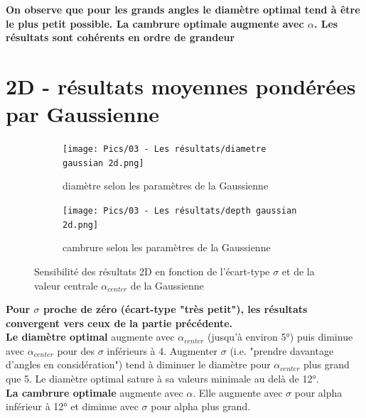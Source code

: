 \textbf{On observe que pour les grands angles le diamètre optimal tend à être le plus petit possible. La cambrure optimale augmente avec $\alpha$. Les résultats sont cohérents en ordre de grandeur}


\section{2D - résultats moyennes pondérées par Gaussienne}
\label{sec:Ch3.2}


\begin{figure}[h!]
    \centering
    \begin{subfigure}[b]{0.45\textwidth}
        \centering
        \texttt{[image: Pics/03 - Les résultats/diametre gaussian 2d.png]}
        \caption{diamètre selon les paramètres de la Gaussienne}
        \label{fig:diametre gaussien 2d}
    \end{subfigure}
    \hfill 
    \begin{subfigure}[b]{0.45\textwidth}
        \centering
        \texttt{[image: Pics/03 - Les résultats/depth gaussian 2d.png]}
        \caption{cambrure selon les paramètres de la Gaussienne}
        \label{fig:cambrure gaussien 2d}
    \end{subfigure}
    \caption{Sensibilité des résultats 2D en fonction de l'écart-type $\sigma$ et de la valeur centrale $\alpha_{center}$ de la Gaussienne}
    \label{fig:gaussian sensibility 2d}
\end{figure}

\textbf{Pour $\sigma$ proche de zéro (écart-type "très petit"), les résultats convergent vers ceux de la partie précédente. }\\

\textbf{Le diamètre optimal} augmente avec $\alpha_{center}$ (jusqu'à environ 5°) puis diminue avec $\alpha_{center}$ pour des $\sigma$ inférieurs à 4. Augmenter $\sigma$ (i.e. "prendre davantage d'angles en considération") tend à diminuer le diamètre pour $\alpha_{center}$ plus grand que 5. Le diamètre optimal sature à sa valeurs minimale au delà de 12°. \\

\textbf{La cambrure optimale} augmente avec $\alpha$. Elle augmente avec $\sigma$ pour alpha inférieur à 12° et diminue avec $\sigma$ pour alpha plus grand.

